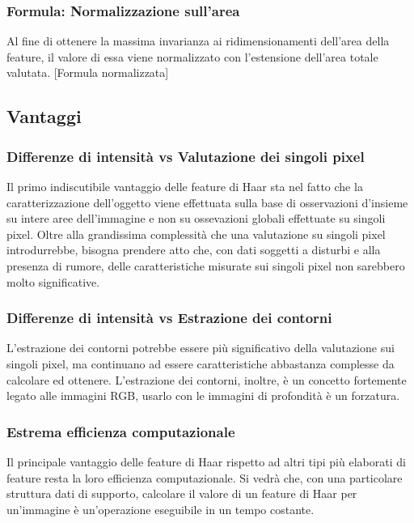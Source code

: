             \subsubsection{Formula: Normalizzazione sull'area}
            Al fine di ottenere la massima invarianza ai ridimensionamenti dell'area della feature, il valore di essa viene normalizzato con l'estensione dell'area totale valutata.
            [Formula normalizzata]

        \subsection{Vantaggi}
            \subsubsection{Differenze di intensità vs Valutazione dei singoli pixel}
            Il primo indiscutibile vantaggio delle feature di Haar sta nel fatto che la caratterizzazione dell'oggetto viene effettuata sulla base di osservazioni d'insieme su intere aree dell'immagine e non su ossevazioni globali effettuate su singoli pixel.
            Oltre alla grandissima complessità che una valutazione su singoli pixel introdurrebbe, bisogna prendere atto che, con dati soggetti a disturbi e alla presenza di rumore, delle caratteristiche misurate sui singoli pixel non sarebbero molto significative.

            \subsubsection{Differenze di intensità vs Estrazione dei contorni}
            L'estrazione dei contorni potrebbe essere più significativo della valutazione sui singoli pixel, ma continuano ad essere caratteristiche abbastanza complesse da calcolare ed ottenere.
            L'estrazione dei contorni, inoltre, è un concetto fortemente legato alle immagini RGB, usarlo con le immagini di profondità è un forzatura.

            \subsubsection{Estrema efficienza computazionale}
            Il principale vantaggio delle feature di Haar rispetto ad altri tipi più elaborati di feature resta la loro efficienza computazionale.
            Si vedrà che, con una particolare struttura dati di supporto, calcolare il valore di un feature di Haar per un'immagine è un'operazione eseguibile in un tempo costante.
